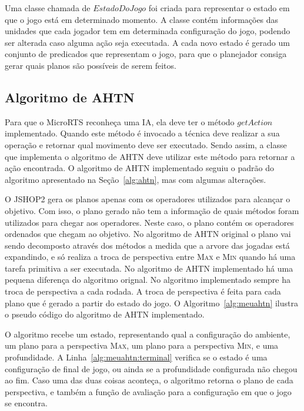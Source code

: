 Uma classe chamada de $EstadoDoJogo$ foi criada para representar o estado em que o jogo está em determinado momento.
A classe contém informações das unidades que cada jogador tem em determinada configuração do jogo, podendo ser alterada caso alguma ação seja executada.
A cada novo estado é gerado um conjunto de predicados que representam o jogo, para que o planejador consiga gerar quais planos são possíveis de serem feitos.

\subsection{Algoritmo de AHTN}

Para que o MicroRTS reconheça uma IA, ela deve ter o método $\mathit{getAction}$ implementado.
Quando este método é invocado a técnica deve realizar a sua operação e retornar qual movimento deve ser executado.
Sendo assim, a classe que implementa o algoritmo de AHTN deve utilizar este método para retornar a ação encontrada.
O algoritmo de AHTN implementado seguiu o padrão do algoritmo apresentado na Seção~\ref{alg:ahtn}, mas com algumas alterações.

O JSHOP2 gera os planos apenas com os operadores utilizados para alcançar o objetivo.
Com isso, o plano gerado não tem a informação de quais métodos foram utilizados para chegar aos operadores.
Neste caso, o plano contém os operadores ordenados que chegam ao objetivo.
No algoritmo de AHTN original o plano vai sendo decomposto através dos métodos a medida que a arvore das jogadas está expandindo, e só realiza a troca de perspectiva entre \textsc{Max} e \textsc{Min} quando há uma tarefa primitiva a ser executada.
No algoritmo de AHTN implementado há uma pequena diferença do algoritmo orignal.
No algoritmo implementado sempre ha troca de perspectiva a cada rodada.
A troca de perspectiva é feita para cada plano que é gerado a partir do estado do jogo.
O Algoritmo~\ref{alg:meuahtn} ilustra o pseudo código do algoritmo de AHTN implementado.

O algoritmo recebe um estado, representando qual a configuração do ambiente, um plano para a perspectiva \textsc{Max}, um plano para a perspectiva \textsc{Min}, e uma profundidade.
A Linha~\ref{alg:meuahtn:terminal} verifica se o estado é uma configuração de final de jogo, ou ainda se a profundidade configurada não chegou ao fim.
Caso uma das duas coisas aconteça, o algoritmo retorna o plano de cada perspectiva, e também a função de avaliação para a configuração em que o jogo se encontra.

